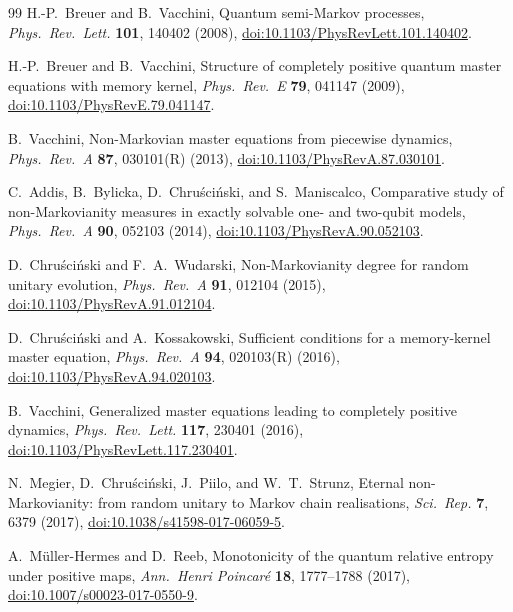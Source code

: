 \documentclass[twocolumn,10pt,amsmath,amssymb,floatfix]{revtex4-2}
\theoremstyle{plain}
\theoremstyle{definition}
\begin{document}
{\begin{thebibliography}{99}
H.-P.~Breuer and B.~Vacchini,
Quantum semi-Markov processes,
\emph{Phys.\ Rev.\ Lett.} \textbf{101}, 140402 (2008),
\href{https://doi.org/10.1103/PhysRevLett.101.140402}{doi:10.1103/PhysRevLett.101.140402}.

H.-P.~Breuer and B.~Vacchini,
Structure of completely positive quantum master equations with memory kernel,
\emph{Phys.\ Rev.\ E} \textbf{79}, 041147 (2009),
\href{https://doi.org/10.1103/PhysRevE.79.041147}{doi:10.1103/PhysRevE.79.041147}.

B.~Vacchini,
Non-Markovian master equations from piecewise dynamics,
\emph{Phys.\ Rev.\ A} \textbf{87}, 030101(R) (2013),
\href{https://doi.org/10.1103/PhysRevA.87.030101}{doi:10.1103/PhysRevA.87.030101}.

C.~Addis, B.~Bylicka, D.~Chru\'sci\'nski, and S.~Maniscalco,
Comparative study of non-Markovianity measures in exactly solvable one- and two-qubit models,
\emph{Phys.\ Rev.\ A} \textbf{90}, 052103 (2014),
\href{https://doi.org/10.1103/PhysRevA.90.052103}{doi:10.1103/PhysRevA.90.052103}.

D.~Chru\'sci\'nski and F.~A.~Wudarski,
Non-Markovianity degree for random unitary evolution,
\emph{Phys.\ Rev.\ A} \textbf{91}, 012104 (2015),
\href{https://doi.org/10.1103/PhysRevA.91.012104}{doi:10.1103/PhysRevA.91.012104}.

D.~Chru\'sci\'nski and A.~Kossakowski,
Sufficient conditions for a memory-kernel master equation,
\emph{Phys.\ Rev.\ A} \textbf{94}, 020103(R) (2016),
\href{https://doi.org/10.1103/PhysRevA.94.020103}{doi:10.1103/PhysRevA.94.020103}.

B.~Vacchini,
Generalized master equations leading to completely positive dynamics,
\emph{Phys.\ Rev.\ Lett.} \textbf{117}, 230401 (2016),
\href{https://doi.org/10.1103/PhysRevLett.117.230401}{doi:10.1103/PhysRevLett.117.230401}.

N.~Megier, D.~Chru\'sci\'nski, J.~Piilo, and W.~T.~Strunz,
Eternal non-Markovianity: from random unitary to Markov chain realisations,
\emph{Sci.\ Rep.} \textbf{7}, 6379 (2017),
\href{https://doi.org/10.1038/s41598-017-06059-5}{doi:10.1038/s41598-017-06059-5}.

A.~M\"uller-Hermes and D.~Reeb,
Monotonicity of the quantum relative entropy under positive maps,
\emph{Ann.\ Henri Poincar\'e} \textbf{18}, 1777--1788 (2017),
\href{https://doi.org/10.1007/s00023-017-0550-9}{doi:10.1007/s00023-017-0550-9}.


\end{thebibliography}}
\end{document}
